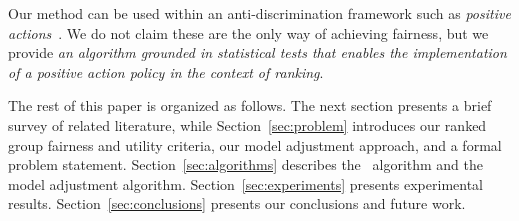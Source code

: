 Our method can be used within an anti-discrimination framework such as \emph{positive actions}~\cite{sowell2005affirmative}. 
%
We do not claim these are the only way of achieving fairness, but we provide \emph{an algorithm grounded in statistical tests that enables the implementation of a positive action policy in the context of ranking}.

The rest of this paper is organized as follows.
%
The next section presents a brief survey of related literature, while Section~\ref{sec:problem} introduces our ranked group fairness and utility criteria, our model adjustment approach, and a formal problem statement.
%
Section~\ref{sec:algorithms} describes the \algoFAIR\ algorithm and the model adjustment algorithm.
%
Section~\ref{sec:experiments} presents experimental results.
%
Section~\ref{sec:conclusions} presents our conclusions and future work.

